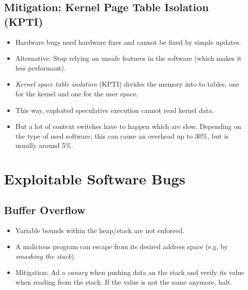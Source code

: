 \documentclass[a4paper, 11pt, accentcolor = tud3b]{tudreport}
\begin{document}
            \subsection{Mitigation: Kernel Page Table Isolation (KPTI)}
                \begin{itemize}
                	\item Hardware bugs need hardware fixes and cannot be fixed by simple updates.
                	\item Alternative: Stop relying on unsafe features in the software (which makes it less performant).
                	\item \textit{Kernel space table isolation} (KPTI) divides the memory into to tables, one for the kernel and one for the user space.
                	\item This way, exploited speculative execution cannot read kernel data.
                	\item But a lot of context switches have to happen which are slow. Depending on the type of used software, this can cause an overhead up to 30\%, but is usually around 5\%.
                \end{itemize}

        \section{Exploitable Software Bugs}
            \subsection{Buffer Overflow}
                \begin{itemize}
                	\item Variable bounds within the heap/stack are not enforced.
                	\item A malicious program can escape from its desired address space (e.g. by \textit{smashing the stack}).
                	\item Mitigation: Ad a \textit{canary} when pushing data an the stack and verify its value when reading from the stack. If the value is not the same anymore, halt.
                \end{itemize}
\end{document}
